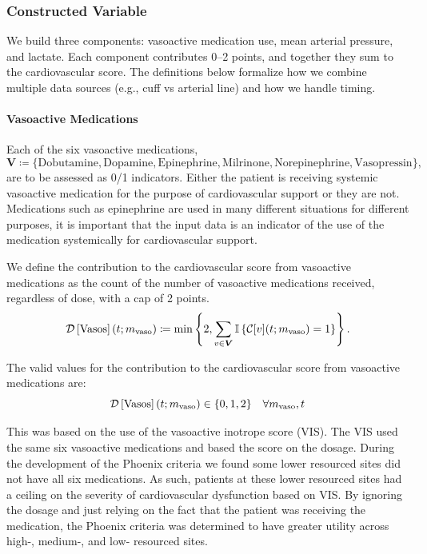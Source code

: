 \documentclass[letterpaper,10pt]{article}
\begin{document}
\subsubsection{Constructed Variable}\label{sec:card-constructed}

We build three components: vasoactive medication use, mean arterial
pressure, and lactate. Each component contributes 0--2 points, and
together they sum to the cardiovascular score. The definitions below
formalize how we combine multiple data sources (e.g., cuff vs arterial
line) and how we handle timing.

\paragraph{Vasoactive Medications}

Each of the six vasoactive medications,
\begin{equation}
  \label{eq:vasoactive-medications}
  \boldsymbol{V} \coloneqq \{\mathrm{Dobutamine}, \mathrm{Dopamine},
  \mathrm{Epinephrine}, \mathrm{Milrinone}, \mathrm{Norepinephrine},
  \mathrm{Vasopressin} \},
\end{equation}
are to be assessed as 0/1 indicators. Either the patient is receiving systemic
vasoactive medication for the purpose of cardiovascular support or they are not.
Medications such as epinephrine are used in many
different situations for different purposes, it is important that the input data
is an indicator of the use of the medication systemically for cardiovascular
support.

We define the contribution to the cardiovascular score from vasoactive
medications as the count of the number of vasoactive medications received,
regardless of dose, with a cap of 2 points.
\begin{equation}
  \label{eq:vasos}
  \DS{Vasos}[\m{vaso}] \coloneqq \min\left\{2, \sum_{v \in \boldsymbol{V}}
  \mathbb{I}\left\{\mathcal{C}[v](t;\m{vaso}) = 1\right\} \right\}.
\end{equation}

The valid values for the contribution to the cardiovascular score from
vasoactive medications are:
\begin{equation}
  \label{eq:vasos-valid-values}
  \DS{Vasos}[\m{vaso}] \in \{0,1,2\} \quad \forall \m{vaso},t
\end{equation}

This was based on the use of the vasoactive inotrope score
(VIS)\citep{Haque2015}.  The VIS used the same six vasoactive
medications and based the score on the dosage.  During the development of the
Phoenix criteria we found some lower resourced sites did not have all six
medications.  As such, patients at these lower resourced sites had a ceiling on
the severity of cardiovascular dysfunction based on VIS.  By ignoring the dosage
and just relying on the fact that the patient was receiving the medication, the
Phoenix criteria was determined to have greater utility across high-, medium-,
and low- resourced sites.
\end{document}

